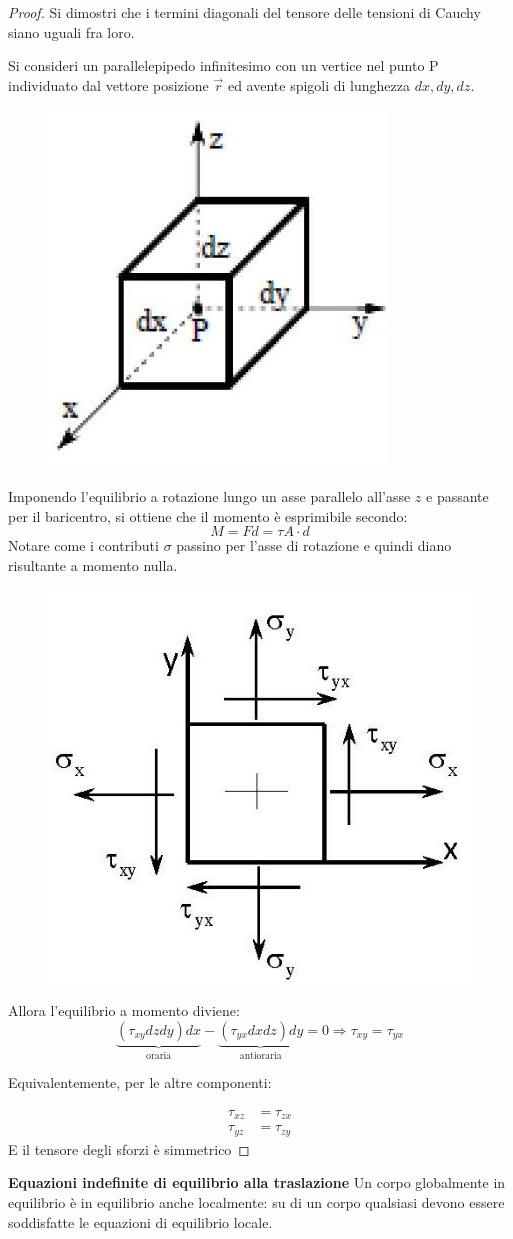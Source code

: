 \documentclass{article}
\begin{document}
\begin{adjustwidth}{2in}{}
\begin{proof}
	Si dimostri che i termini diagonali del tensore delle tensioni di Cauchy siano uguali fra loro. \newline 
	
	Si consideri un parallelepipedo infinitesimo con un vertice nel punto P individuato
	dal vettore posizione $\vec{r}$ ed avente spigoli di lunghezza $dx, dy, dz$.	
\begin{figure}[H]
	\centering
	\includegraphics[width=0.2\linewidth]{immagini/1.PARTE7_Pagina_09 (2)}
\end{figure}
	Imponendo l'equilibrio a rotazione lungo un asse parallelo all'asse $ z $ e passante per il baricentro, si ottiene che il momento è esprimibile secondo:
	\[M = Fd = \tau A \cdot d\]
	Notare come i contributi $\sigma$ passino per l'asse di rotazione e quindi diano risultante a momento nulla.
	\begin{figure}[H]
		\centering
		\includegraphics[width=0.3\linewidth]{immagini/1.PARTE7_Pagina_09}
	\end{figure}
	Allora l'equilibrio a momento diviene:
	\[
	\underbrace{\left(\tau_{xy}dzdy \right) dx }_{\text{oraria}}- \underbrace{\left(\tau_{yx}dxdz \right) dy}_{\text{antioraria}} = 0 \Rightarrow \tau_{xy} = \tau_{yx}
	\]
	
	Equivalentemente, per le altre componenti:
	
	\[
	\begin{split}
	\tau_{xz} & = \tau_{zx} \\
	\tau_{yz} & = \tau_{zy}
	\end{split}
	\]
	 E il tensore degli sforzi è simmetrico
\end{proof}	 
\newpage	 
{\Large \textbf{Equazioni indefinite di equilibrio alla traslazione}}\newline
	Un corpo globalmente in equilibrio è in equilibrio anche localmente: su di un corpo qualsiasi devono essere soddisfatte le equazioni di equilibrio locale. \newline 
	

\end{adjustwidth}
\end{document}
